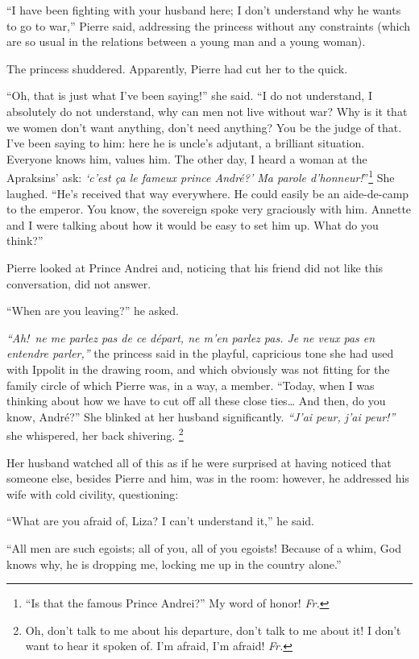 ``I have been fighting with your husband here; I don't understand why he wants to go to war,'' Pierre said, addressing the princess without any constraints (which are so usual in the relations between a young man and a young woman). %

The princess shuddered. Apparently, Pierre had cut her to the quick.

``Oh, that is just what I've been saying!'' she said. ``I do not understand, I absolutely do not understand, why can men not live without war? Why is it that we women don't want anything, don't need anything? You be the judge of that. I've been saying to him: here he is uncle's adjutant, a brilliant situation. Everyone knows him, values him. The other day, I heard a woman at the Apraksins' ask: \textit{`c'est \c ca le fameux prince Andr\'e?' Ma parole d'honneur!}''\footnote{``Is that the famous Prince Andrei?'' My word of honor! \textit{Fr.}} She laughed. ``He's received that way everywhere. He could easily be an aide-de-camp to the emperor. You know, the sovereign spoke very graciously with him. Annette and I were talking about how it would be easy to set him up. What do you think?'' %

Pierre looked at Prince Andrei and, noticing that his friend did not like this conversation, did not answer.

``When are you leaving?'' he asked. %

\textit{``Ah!~ne me parlez pas de ce d\'epart, ne m'en parlez pas. Je ne veux pas en entendre parler,''} the princess said in the playful, capricious tone she had used with Ippolit in the drawing room, and which obviously was not fitting for the family circle of which Pierre was, in a way, a member. ``Today, when I was thinking about how we have to cut off all these close ties\ldots{} And then, do you know, Andr\'e?'' She blinked at her husband significantly. \textit{``J'ai peur, j'ai peur!''} she whispered, her back shivering. \footnote{Oh, don't talk to me about his departure, don't talk to me about it! I don't want to hear it spoken of. I'm afraid, I'm afraid! \textit{Fr.}} %

Her husband watched all of this as if he were surprised at having noticed that someone else, besides Pierre and him, was in the room: however, he addressed his wife with cold civility, questioning:

``What are you afraid of, Liza? I can't understand it,'' he said. %

``All men are such egoists; all of you, all of you egoists! Because of a whim, God knows why, he is dropping me, locking me up in the country alone.'' %

